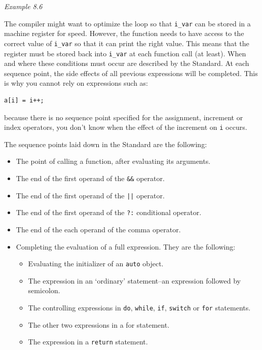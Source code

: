   \begin{center}\textit{Example 8.6}\end{center}


  The compiler might want to optimize the loop so that \texttt{i\_var}
   can be stored in a machine register for speed. However, the function
   needs to have access to the correct value of \texttt{i\_var} so that
   it can print the right value. This means that the register must be stored
   back into \texttt{i\_var} at each function call (at least).  When and
   where these conditions must occur are described by the Standard. At each
   sequence point, the side effects of all previous expressions will be
   completed. This is why you cannot rely on expressions such as:


  \begin{Verbatim}
a[i] = i++;
\end{Verbatim}

  because there is no sequence point specified for the assignment,
   increment or index operators, you don't know when the effect of the
   increment on \texttt{i} occurs.


  The sequence points laid down in the Standard are the following:


  \begin{itemize}
   \item The point of calling a function, after evaluating its arguments.

   \item The end of the first operand of the \texttt{\&\&}
    operator.

   \item The end of the first operand of the \texttt{||} operator.

   \item The end of the first operand of the \texttt{?:} conditional
    operator.

   \item The end of the each operand of the comma operator.

   \item Completing the evaluation of a full expression. They are the
    following:

    \begin{itemize}
     \item Evaluating the initializer of an \texttt{auto} object.

     \item The expression in an `ordinary' statement--an expression
      followed by semicolon.

     \item The controlling expressions in \texttt{do}, \texttt{while},
      \texttt{if}, \texttt{switch} or \texttt{for}
      statements.

     \item The other two expressions in a for statement.

     \item The expression in a \texttt{return} statement.
    \end{itemize}
   
  \end{itemize}

